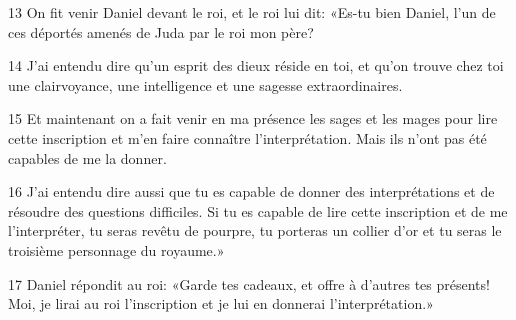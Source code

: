 13 On fit venir Daniel devant le roi, et le roi lui dit: «Es-tu bien Daniel, l’un de ces déportés amenés de Juda par le roi mon père?

14 J’ai entendu dire qu’un esprit des dieux réside en toi, et qu’on trouve chez toi une clairvoyance, une intelligence et une sagesse extraordinaires.

15 Et maintenant on a fait venir en ma présence les sages et les mages pour lire cette inscription et m’en faire connaître l’interprétation. Mais ils n’ont pas été capables de me la donner.

16 J’ai entendu dire aussi que tu es capable de donner des interprétations et de résoudre des questions difficiles. Si tu es capable de lire cette inscription et de me l’interpréter, tu seras revêtu de pourpre, tu porteras un collier d’or et tu seras le troisième personnage du royaume.»

17 Daniel répondit au roi: «Garde tes cadeaux, et offre à d’autres tes présents! Moi, je lirai au roi l’inscription et je lui en donnerai l’interprétation.»